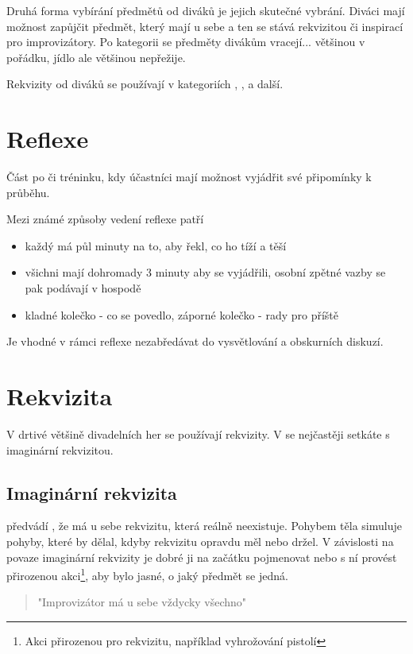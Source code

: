 Druhá forma vybírání předmětů od diváků je jejich skutečné vybrání. Diváci mají možnost zapůjčit předmět, který mají u sebe a ten se stává rekvizitou či inspirací pro improvizátory. Po kategorii se předměty divákům vracejí... většinou v pořádku, jídlo ale většinou nepřežije. 
 
Rekvizity od diváků se používají v kategoriích , , a další. 
 
 
\needspace{5cm} \section{Reflexe} \label{reflexe} Část po  či tréninku, kdy účastníci mají možnost vyjádřit své připomínky k průběhu. 
 
Mezi známé způsoby vedení reflexe patří 
\begin{itemize}
\item každý má půl minuty na to, aby řekl, co ho tíží a těší
\item všichni mají dohromady 3 minuty aby se vyjádřili, osobní zpětné vazby se pak podávají v hospodě
\item kladné kolečko - co se povedlo, záporné kolečko - rady pro příště
\end{itemize}
 
Je vhodné v rámci reflexe nezabředávat do vysvětlování a obskurních diskuzí.    
    
 
\needspace{5cm} \section{Rekvizita} \label{rekvizita} V drtivé většině divadelních her se používají rekvizity. V  se nejčastěji setkáte s imaginární rekvizitou. 
 
 
\subsection{ Imaginární rekvizita }  předvádí , že má u sebe rekvizitu, která reálně neexistuje. Pohybem těla simuluje pohyby, které by dělal, kdyby rekvizitu opravdu měl nebo držel. V závislosti na povaze imaginární rekvizity je dobré ji na začátku pojmenovat nebo s ní provést přirozenou akci\footnote{Akci přirozenou pro rekvizitu, například vyhrožování pistolí}, aby bylo jasné, o jaký předmět se jedná. 
 
\begin{quote}"Improvizátor má u sebe vždycky všechno"\end{quote} 
 
